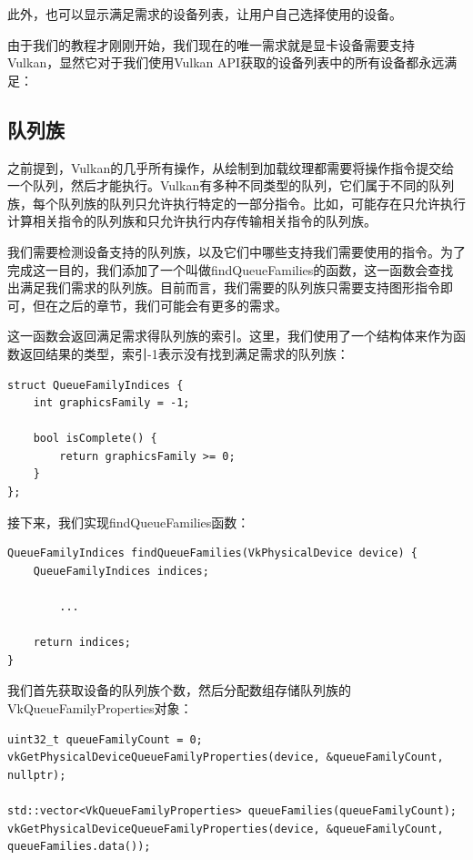 \documentclass{ctexart}
\begin{document}
此外，也可以显示满足需求的设备列表，让用户自己选择使用的设备。

由于我们的教程才刚刚开始，我们现在的唯一需求就是显卡设备需要支持Vulkan，显然它对于我们使用Vulkan API获取的设备列表中的所有设备都永远满足：

\subsection{队列族}

之前提到，Vulkan的几乎所有操作，从绘制到加载纹理都需要将操作指令提交给一个队列，然后才能执行。Vulkan有多种不同类型的队列，它们属于不同的队列族，每个队列族的队列只允许执行特定的一部分指令。比如，可能存在只允许执行计算相关指令的队列族和只允许执行内存传输相关指令的队列族。

我们需要检测设备支持的队列族，以及它们中哪些支持我们需要使用的指令。为了完成这一目的，我们添加了一个叫做findQueueFamilies的函数，这一函数会查找出满足我们需求的队列族。目前而言，我们需要的队列族只需要支持图形指令即可，但在之后的章节，我们可能会有更多的需求。

这一函数会返回满足需求得队列族的索引。这里，我们使用了一个结构体来作为函数返回结果的类型，索引-1表示没有找到满足需求的队列族：

\begin{lstlisting}[language={[ANSI]C}]
struct QueueFamilyIndices {
	int graphicsFamily = -1;

	bool isComplete() {
		return graphicsFamily >= 0;
	}
};
\end{lstlisting}

接下来，我们实现findQueueFamilies函数：

\begin{lstlisting}[language={[ANSI]C}]
QueueFamilyIndices findQueueFamilies(VkPhysicalDevice device) {
	QueueFamilyIndices indices;

		...

	return indices;
}
\end{lstlisting}

我们首先获取设备的队列族个数，然后分配数组存储队列族的VkQueueFamilyProperties对象：

\begin{lstlisting}[language={[ANSI]C}]
uint32_t queueFamilyCount = 0;
vkGetPhysicalDeviceQueueFamilyProperties(device, &queueFamilyCount, nullptr);

std::vector<VkQueueFamilyProperties> queueFamilies(queueFamilyCount);
vkGetPhysicalDeviceQueueFamilyProperties(device, &queueFamilyCount, queueFamilies.data());
\end{lstlisting}
\end{document}
